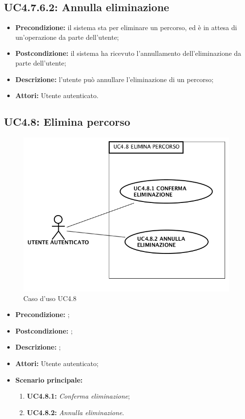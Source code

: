 \subsection{ UC4.7.6.2: Annulla eliminazione}

\begin{itemize}
	\item \textbf{Precondizione:} il sistema sta per eliminare un percorso, ed è in attesa di un'operazione da parte dell'utente;
	\item \textbf{Postcondizione:} il sistema ha ricevuto l'annullamento dell'eliminazione da parte dell'utente;
	\item \textbf{Descrizione:} l'utente può annullare l'eliminazione di un percorso;
	\item \textbf{Attori:} Utente autenticato.
\end{itemize}
\subsection{ UC4.8: Elimina percorso}

\begin{figure}[h]
	\begin{center}
	\includegraphics[scale=0.4]{diagram/UC4-8.png}
	\caption{Caso d'uso UC4.8}
	\end{center}
\end{figure}
\begin{itemize}
	\item \textbf{Precondizione:} ;
	\item \textbf{Postcondizione:} ;
	\item \textbf{Descrizione:} ;
	\item \textbf{Attori:} Utente autenticato;
	\item \textbf{Scenario principale:}
	\begin{enumerate}
		\item \textbf{ UC4.8.1:} \textit{ Conferma eliminazione};
		\item \textbf{ UC4.8.2:} \textit{ Annulla eliminazione}.
	\end{enumerate}
\end{itemize}
